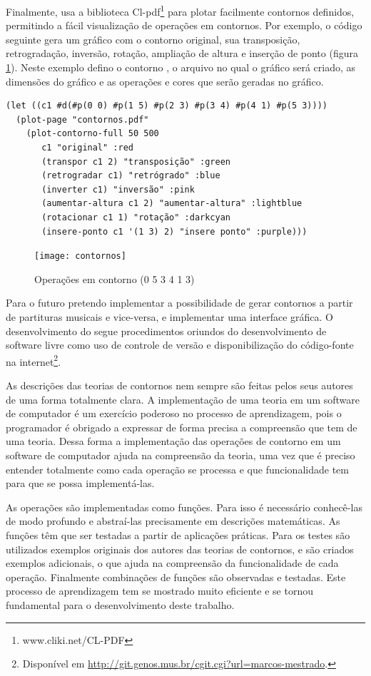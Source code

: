 Finalmente, \goiaba{} usa a biblioteca
Cl-pdf\footnote{www.cliki.net/CL-PDF} para plotar facilmente contornos
definidos, permitindo a fácil visualização de operações em contornos.
Por exemplo, o código seguinte gera um gráfico com o contorno
original, sua transposição, retrogradação, inversão, rotação,
ampliação de altura e inserção de ponto (figura
\ref{fig:operacoes}). Neste exemplo defino o contorno , o
arquivo no qual o gráfico será criado, as dimensões do gráfico e as
operações e cores que serão geradas no gráfico.

\singlespacing
\begin{verbatim}
(let ((c1 #d(#p(0 0) #p(1 5) #p(2 3) #p(3 4) #p(4 1) #p(5 3))))
  (plot-page "contornos.pdf"
    (plot-contorno-full 50 500
       c1 "original" :red
       (transpor c1 2) "transposição" :green
       (retrogradar c1) "retrógrado" :blue
       (inverter c1) "inversão" :pink
       (aumentar-altura c1 2) "aumentar-altura" :lightblue
       (rotacionar c1 1) "rotação" :darkcyan
       (insere-ponto c1 '(1 3) 2) "insere ponto" :purple)))
\end{verbatim}
\doublespacing

\begin{figure}
  \centering
  \texttt{[image: contornos]}
  \caption{Operações em contorno (0 5 3 4 1 3)}
  \label{fig:operacoes}
\end{figure}

Para o futuro pretendo implementar a possibilidade de gerar contornos
a partir de partituras musicais e vice-versa, e implementar uma
interface gráfica. O desenvolvimento do \goiaba{} segue procedimentos
oriundos do desenvolvimento de software livre como uso de controle de
versão e disponibilização do código-fonte na
internet\footnote{Disponível em
  \url{http://git.genos.mus.br/cgit.cgi?url=marcos-mestrado}.}.

As descrições das teorias de contornos nem sempre são feitas pelos
seus autores de uma forma totalmente clara. A implementação de uma
teoria em um software de computador é um exercício poderoso no
processo de aprendizagem, pois o programador é obrigado a expressar de
forma precisa a compreensão que tem de uma teoria. Dessa forma a
implementação das operações de contorno em um software de computador
ajuda na compreensão da teoria, uma vez que é preciso entender
totalmente como cada operação se processa e que funcionalidade tem
para que se possa implementá-las.

As operações são implementadas como funções. Para isso é necessário
conhecê-las de modo profundo e abstraí-las precisamente em descrições
matemáticas. As funções têm que ser testadas a partir de aplicações
práticas. Para os testes são utilizados exemplos originais dos autores
das teorias de contornos, e são criados exemplos adicionais, o que
ajuda na compreensão da funcionalidade de cada operação. Finalmente
combinações de funções são observadas e testadas. Este processo de
aprendizagem tem se mostrado muito eficiente e se tornou fundamental
para o desenvolvimento deste trabalho.

